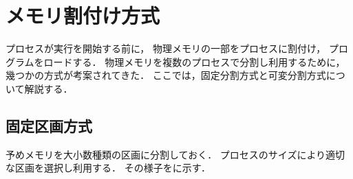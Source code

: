 \chapter{メモリ割付け方式}
プロセスが実行を開始する前に，
物理メモリの一部をプロセスに割付け，
プログラムをロードする．
物理メモリを複数のプロセスで分割し利用するために，
幾つかの方式が考案されてきた．
ここでは，固定分割方式と可変分割方式について解説する．

\section{固定区画方式}
予めメモリを大小数種類の区画に分割しておく．
プロセスのサイズにより適切な区画を選択し利用する．
その様子をに示す．

